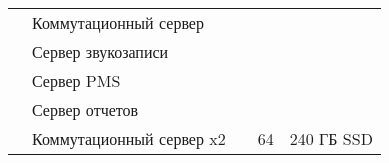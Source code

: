 \begin{small}
\begin{longtable}{|p{}                |p{}         |p{}                                                           |p{}              |p{}|}
                                  & Коммутационный сервер   &                                                                        &                              & \\
                                  & Сервер звукозаписи      &                                                                        &                              & \\
                                  & Сервер PMS              &                                                                        &                              & \\
                                  & Сервер отчетов          &                                                                        &                              & \\
    \cline{2-2}\cline{4-5}
                                  & Коммутационный сервер x2&                                                                        & 64                           & 240 ГБ SSD \\
\end{longtable}
\end{small}


